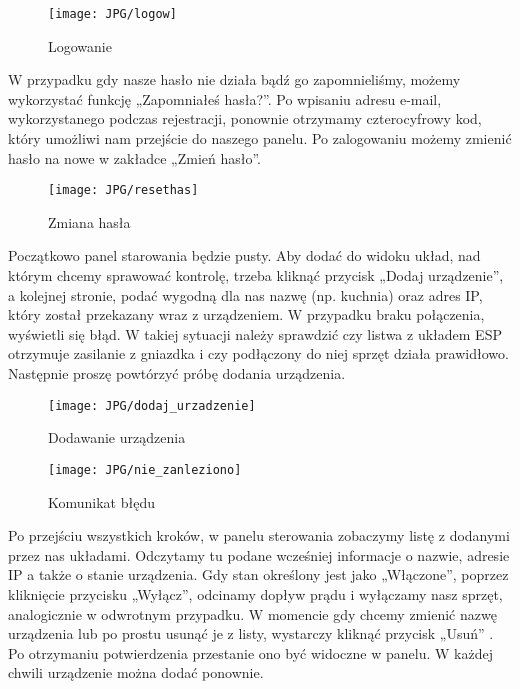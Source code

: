 \documentclass{xmgr}
\begin{document}
\begin{figure}
\begin{center}
\texttt{[image: JPG/logow]}
\caption{Logowanie}
\end{center}
\end{figure}

\newpage W przypadku gdy nasze hasło nie działa bądź go zapomnieliśmy, możemy wykorzystać funkcję  „Zapomniałeś hasła?”. Po wpisaniu adresu e-mail, wykorzystanego podczas rejestracji, ponownie otrzymamy czterocyfrowy kod, który umożliwi nam przejście do naszego panelu. Po zalogowaniu możemy zmienić hasło na nowe w zakładce „Zmień hasło”.

\hspace{2cm}
\begin{figure}[h]
\begin{center}
\texttt{[image: JPG/resethas]}
\caption{Zmiana hasła}
\end{center}
\end{figure}


Początkowo panel starowania będzie pusty. Aby dodać do widoku układ, nad którym chcemy sprawować kontrolę, trzeba kliknąć przycisk „Dodaj urządzenie”, a kolejnej stronie, podać  wygodną dla nas nazwę (np. kuchnia) oraz adres IP, który został przekazany wraz z urządzeniem. W przypadku braku połączenia, wyświetli się błąd. W takiej sytuacji należy sprawdzić czy listwa z układem ESP otrzymuje zasilanie z gniazdka i czy podłączony do niej sprzęt działa prawidłowo. Następnie proszę powtórzyć próbę dodania urządzenia. 

\begin{figure}
\begin{center}
\texttt{[image: JPG/dodaj\_urzadzenie]}
\caption{Dodawanie urządzenia}
\end{center}
\end{figure}

\begin{figure}
\begin{center}
\texttt{[image: JPG/nie\_zanleziono]}
\caption{Komunikat błędu}
\end{center}
\end{figure}

\newpage Po przejściu wszystkich kroków, w panelu sterowania zobaczymy listę z dodanymi przez nas układami. Odczytamy tu podane wcześniej informacje o nazwie, adresie IP a także o stanie urządzenia. Gdy stan określony jest jako „Włączone”, poprzez kliknięcie przycisku „Wyłącz”, odcinamy dopływ prądu i wyłączamy nasz sprzęt, analogicznie w odwrotnym przypadku. W momencie gdy chcemy zmienić nazwę urządzenia lub po prostu usunąć je z listy, wystarczy kliknąć przycisk „Usuń” . Po otrzymaniu potwierdzenia przestanie ono być widoczne w panelu. W każdej chwili urządzenie można dodać ponownie. 
\end{document}
